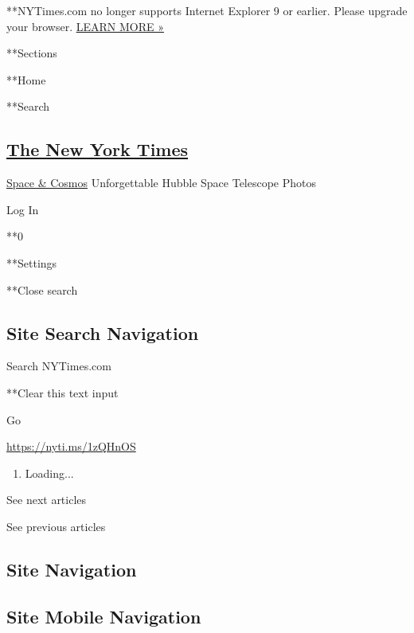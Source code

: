  **NYTimes.com no longer supports Internet Explorer 9 or earlier. Please
upgrade your browser.
\href{http://www.nytimes3xbfgragh.onion/content/help/site/ie9-support.html}{LEARN
MORE »}

**Sections

**Home

**Search

\hypertarget{the-new-york-times}{%
\subsection{\texorpdfstring{\href{http://www.nytimes3xbfgragh.onion/}{The
New York Times}}{The New York Times}}\label{the-new-york-times}}

 \href{https://www.nytimes3xbfgragh.onion/section/science/space}{Space
\& Cosmos} \textbar{}Unforgettable Hubble Space Telescope Photos

Log In

**0

**Settings

**Close search

\hypertarget{site-search-navigation}{%
\subsection{Site Search Navigation}\label{site-search-navigation}}

Search NYTimes.com

**Clear this text input

Go

\url{https://nyti.ms/1zQHnOS}

\begin{enumerate}
\def\labelenumi{\arabic{enumi}.}
\item
  Loading...
\end{enumerate}

See next articles

See previous articles

\hypertarget{site-navigation}{%
\subsection{Site Navigation}\label{site-navigation}}

\hypertarget{site-mobile-navigation}{%
\subsection{Site Mobile Navigation}\label{site-mobile-navigation}}


